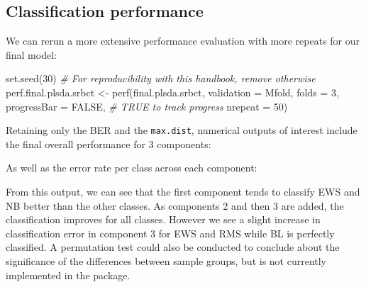 \documentclass[
]{book}
\newenvironment{Shaded}{\begin{snugshade}}{\end{snugshade}}
\newcommand{\AttributeTok}[1]{\textcolor[rgb]{0.77,0.63,0.00}{#1}}
\newcommand{\CommentTok}[1]{\textcolor[rgb]{0.56,0.35,0.01}{\textit{#1}}}
\newcommand{\ConstantTok}[1]{\textcolor[rgb]{0.00,0.00,0.00}{#1}}
\newcommand{\DecValTok}[1]{\textcolor[rgb]{0.00,0.00,0.81}{#1}}
\newcommand{\FunctionTok}[1]{\textcolor[rgb]{0.00,0.00,0.00}{#1}}
\newcommand{\NormalTok}[1]{#1}
\newcommand{\OtherTok}[1]{\textcolor[rgb]{0.56,0.35,0.01}{#1}}
\newcommand{\SpecialCharTok}[1]{\textcolor[rgb]{0.00,0.00,0.00}{#1}}
\newcommand{\StringTok}[1]{\textcolor[rgb]{0.31,0.60,0.02}{#1}}
\begin{document}
\hypertarget{plsda:perf}{%
\subsection{Classification performance}\label{plsda:perf}}

We can rerun a more extensive performance evaluation with more repeats for our final model:

\begin{Shaded}
\begin{Highlighting}[]
\FunctionTok{set.seed}\NormalTok{(}\DecValTok{30}\NormalTok{) }\CommentTok{\# For reproducibility with this handbook, remove otherwise}
\NormalTok{perf.final.plsda.srbct }\OtherTok{\textless{}{-}} \FunctionTok{perf}\NormalTok{(final.plsda.srbct, }\AttributeTok{validation =} \StringTok{\textquotesingle{}Mfold\textquotesingle{}}\NormalTok{, }
                               \AttributeTok{folds =} \DecValTok{3}\NormalTok{, }
                               \AttributeTok{progressBar =} \ConstantTok{FALSE}\NormalTok{, }\CommentTok{\# TRUE to track progress}
                               \AttributeTok{nrepeat =} \DecValTok{50}\NormalTok{) }
\end{Highlighting}
\end{Shaded}

Retaining only the BER and the \texttt{max.dist}, numerical outputs of interest include the final overall performance for 3 components:

\begin{Shaded}
\end{Shaded}

As well as the error rate per class across each component:

\begin{Shaded}
\end{Shaded}

From this output, we can see that the first component tends to classify EWS and NB better than the other classes. As components 2 and then 3 are added, the classification improves for all classes. However we see a slight increase in classification error in component 3 for EWS and RMS while BL is perfectly classified. A permutation test could also be conducted to conclude about the significance of the differences between sample groups, but is not currently implemented in the package.
\end{document}
